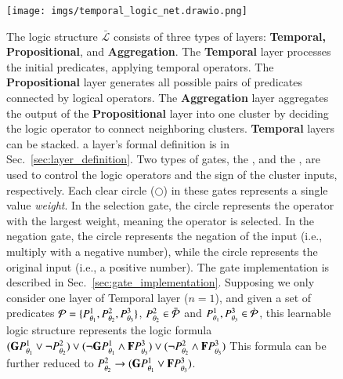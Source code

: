 \begin{figure}[!htp]
    \centering
    \texttt{[image: imgs/temporal\_logic\_net.drawio.png]}
    \caption{
        The logic structure $\bar{\mathcal{L}}$ consists of three types of layers: \textbf{Temporal, Propositional}, and \textbf{Aggregation}. The \textbf{Temporal} layer processes the initial predicates, applying temporal operators. The \textbf{Propositional} layer generates all possible pairs of predicates connected by logical operators. The \textbf{Aggregation} layer aggregates the output of the \textbf{Propositional} layer into one cluster by deciding the logic operator to connect neighboring clusters. \textbf{Temporal} layers can be stacked. a layer's formal definition is in Sec.~\ref{sec:layer_definition}.
        Two types of gates, the \selectiongate, and the \negationgate, are used to control the logic operators and the sign of the cluster inputs, respectively. Each clear circle ($\bigcirc$) in these gates represents a single value \emph{weight}. In the selection gate, the
        \protect{} circle represents the operator with the largest weight, meaning the operator is selected. In the negation gate, the \protect{} circle represents the negation of the input (i.e., multiply with a negative number), while the \protect{} circle represents the original input (i.e., a positive number). The gate implementation is described in Sec.~\ref{sec:gate_implementation}. Supposing we only consider one layer of Temporal layer ($n = 1$), and given a set of predicates $\mathcal{P} = \{P^{1}_{\theta_1}, P^{2}_{\theta_2}, P^{3}_{\theta_3}\}$, $P^{2}_{\theta_2} \in \bar{\mathcal{P}}$ and $P^{1}_{\theta_1}, P^{3}_{\theta_3} \in \dot{\mathcal{P}}$, this learnable logic structure represents the logic formula $(\mathbf{G} P^{1}_{\theta_1} \lor \lnot P^{2}_{\theta_2}) \lor (\lnot \mathbf{G} P^{1}_{\theta_1} \land \mathbf{F} P^{3}_{\theta_3}) \lor (\lnot P^{2}_{\theta_2} \land \mathbf{F} P^{3}_{\theta_3})$
        This formula can be further reduced to $P^{2}_{\theta_2} \rightarrow (\mathbf{G} P^{1}_{\theta_1} \lor \mathbf{F} P^{3}_{\theta_3})$.
    }
    \label{fig:learnable_logic_structure}
\end{figure}

